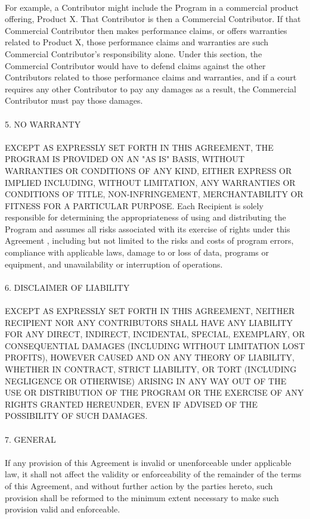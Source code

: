 \documentclass[a4paper, 12pt]{book}
\begin{document}
{\\
For example, a Contributor might include the Program in a commercial product offering, Product X. That Contributor is then a Commercial Contributor. If that Commercial Contributor then makes performance claims, or offers warranties related to Product X, those performance claims and warranties are such Commercial Contributor's responsibility alone. Under this section, the Commercial Contributor would have to defend claims against the other Contributors related to those performance claims and warranties, and if a court requires any other Contributor to pay any damages as a result, the Commercial Contributor must pay those damages.\\
\\
5. NO WARRANTY\\
\\
EXCEPT AS EXPRESSLY SET FORTH IN THIS AGREEMENT, THE PROGRAM IS PROVIDED ON AN "AS IS" BASIS, WITHOUT WARRANTIES OR CONDITIONS OF ANY KIND, EITHER EXPRESS OR IMPLIED INCLUDING, WITHOUT LIMITATION, ANY WARRANTIES OR CONDITIONS OF TITLE, NON-INFRINGEMENT, MERCHANTABILITY OR FITNESS FOR A PARTICULAR PURPOSE. Each Recipient is solely responsible for determining the appropriateness of using and distributing the Program and assumes all risks associated with its exercise of rights under this Agreement , including but not limited to the risks and costs of program errors, compliance with applicable laws, damage to or loss of data, programs or equipment, and unavailability or interruption of operations.\\
\\
6. DISCLAIMER OF LIABILITY\\
\\
EXCEPT AS EXPRESSLY SET FORTH IN THIS AGREEMENT, NEITHER RECIPIENT NOR ANY CONTRIBUTORS SHALL HAVE ANY LIABILITY FOR ANY DIRECT, INDIRECT, INCIDENTAL, SPECIAL, EXEMPLARY, OR CONSEQUENTIAL DAMAGES (INCLUDING WITHOUT LIMITATION LOST PROFITS), HOWEVER CAUSED AND ON ANY THEORY OF LIABILITY, WHETHER IN CONTRACT, STRICT LIABILITY, OR TORT (INCLUDING NEGLIGENCE OR OTHERWISE) ARISING IN ANY WAY OUT OF THE USE OR DISTRIBUTION OF THE PROGRAM OR THE EXERCISE OF ANY RIGHTS GRANTED HEREUNDER, EVEN IF ADVISED OF THE POSSIBILITY OF SUCH DAMAGES.\\
\\
7. GENERAL\\
\\
If any provision of this Agreement is invalid or unenforceable under applicable law, it shall not affect the validity or enforceability of the remainder of the terms of this Agreement, and without further action by the parties hereto, such provision shall be reformed to the minimum extent necessary to make such provision valid and enforceable.\\
}
\end{document}
